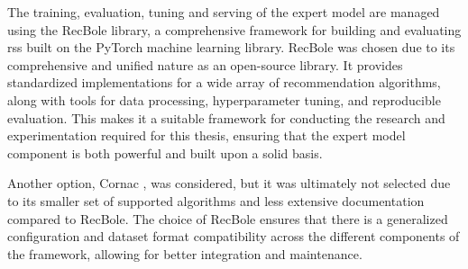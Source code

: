 The training, evaluation, tuning and serving of the expert model are managed using the RecBole \cite{RECBOLE} library, a comprehensive framework for building and evaluating \aclp{rs} built on the PyTorch \cite{PYTORCH} machine learning library. RecBole was chosen due to its comprehensive and unified nature as an open-source library. It provides standardized implementations for a wide array of recommendation algorithms, along with tools for data processing, hyperparameter tuning, and reproducible evaluation. This makes it a suitable framework for conducting the research and experimentation required for this thesis, ensuring that the expert model component is both powerful and built upon a solid basis.

Another option, Cornac \cite{CORNAC}, was considered, but it was ultimately not selected due to its smaller set of supported algorithms and less extensive documentation compared to RecBole. The choice of RecBole ensures that there is a generalized configuration and dataset format compatibility across the different components of the framework, allowing for better integration and maintenance.